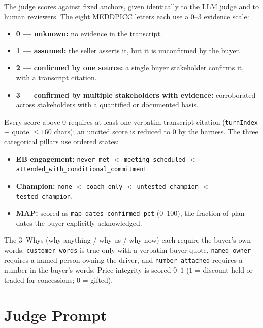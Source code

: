 The judge scores against fixed anchors, given identically to the LLM judge and to
human reviewers. The eight MEDDPICC letters each use a $0$--$3$ evidence scale:

\begin{itemize}[leftmargin=1.4em,itemsep=1pt,topsep=2pt]
  \item \textbf{0 --- unknown:} no evidence in the transcript.
  \item \textbf{1 --- assumed:} the seller asserts it, but it is unconfirmed by the
  buyer.
  \item \textbf{2 --- confirmed by one source:} a single buyer stakeholder confirms
  it, with a transcript citation.
  \item \textbf{3 --- confirmed by multiple stakeholders with evidence:} corroborated
  across stakeholders with a quantified or documented basis.
\end{itemize}

Every score above $0$ requires at least one verbatim transcript citation
(\texttt{turnIndex} + quote $\le 160$ chars); an uncited score is reduced to $0$ by
the harness. The three categorical pillars use ordered states:

\begin{itemize}[leftmargin=1.4em,itemsep=1pt,topsep=2pt]
  \item \textbf{EB engagement:} \texttt{never\_met} $<$ \texttt{meeting\_scheduled}
  $<$ \texttt{attended\_with\_conditional\_commitment}.
  \item \textbf{Champion:} \texttt{none} $<$ \texttt{coach\_only} $<$
  \texttt{untested\_champion} $<$ \texttt{tested\_champion}.
  \item \textbf{MAP:} scored as \texttt{map\_dates\_confirmed\_pct} ($0$--$100$),
  the fraction of plan dates the buyer explicitly acknowledged.
\end{itemize}

The 3~Whys (why anything / why us / why now) each require the buyer's own words:
\texttt{customer\_words} is true only with a verbatim buyer quote,
\texttt{named\_owner} requires a named person owning the driver, and
\texttt{number\_attached} requires a number in the buyer's words. Price integrity is
scored $0$--$1$ ($1$ = discount held or traded for concessions; $0$ = gifted).

\section{Judge Prompt}
\label{app:judgeprompt}

